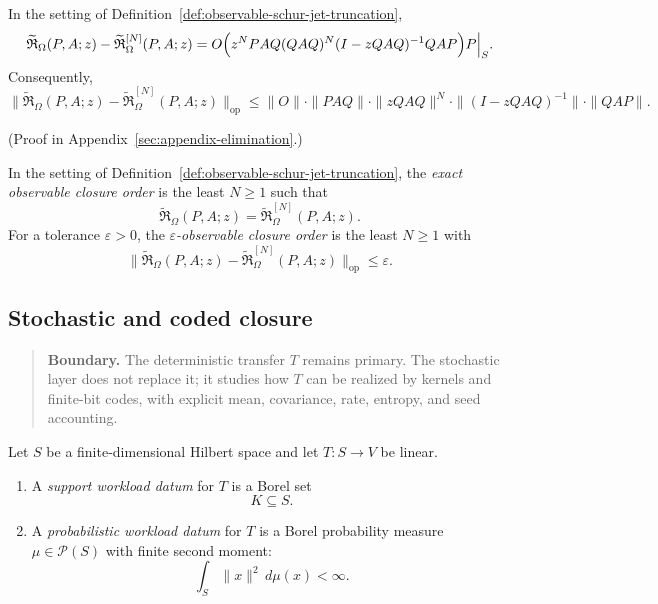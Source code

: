 \begin{theorem}
\label{thm:observable-schur-jet-remainder}
In the setting of Definition~\ref{def:observable-schur-jet-truncation},
\[
\widetilde{\mathfrak R}_{\Omega}(P,A;z)
-\widetilde{\mathfrak R}_{\Omega}^{[N]}(P,A;z)
=
O\Bigl(
z^N PAQ(QAQ)^N(I-zQAQ)^{-1}QAP
\Bigr)P\Big|_{S}.
\]
Consequently,
\[
\bigl\|
\widetilde{\mathfrak R}_{\Omega}(P,A;z)
-\widetilde{\mathfrak R}_{\Omega}^{[N]}(P,A;z)
\bigr\|_{\mathrm{op}}
\le
\|O\|\cdot \|PAQ\|\cdot \|zQAQ\|^N\cdot \|(I-zQAQ)^{-1}\|\cdot \|QAP\|.
\]
\end{theorem}

(Proof in Appendix~\ref{sec:appendix-elimination}.)

\begin{definition}
\label{def:observable-closure-order}
In the setting of Definition~\ref{def:observable-schur-jet-truncation}, the
\emph{exact observable closure order} is the least \(N\ge 1\) such that
\[
\widetilde{\mathfrak R}_{\Omega}(P,A;z)
=
\widetilde{\mathfrak R}_{\Omega}^{[N]}(P,A;z).
\]
For a tolerance \(\varepsilon>0\), the \emph{\(\varepsilon\)-observable closure
order} is the least \(N\ge 1\) with
\[
\bigl\|
\widetilde{\mathfrak R}_{\Omega}(P,A;z)
-\widetilde{\mathfrak R}_{\Omega}^{[N]}(P,A;z)
\bigr\|_{\mathrm{op}}
\le \varepsilon.
\]
\end{definition}

\subsection{Stochastic and coded closure}

\begin{quote}\small
\textbf{Boundary.}
The deterministic transfer \(T\) remains primary. The stochastic layer does not
replace it; it studies how \(T\) can be realized by kernels and finite-bit
codes, with explicit mean, covariance, rate, entropy, and seed accounting.
\end{quote}

\begin{definition}
\label{def:stochastic-workload-data}
Let \(S\) be a finite-dimensional Hilbert space and let \(T:S\to V\) be
linear.
\begin{enumerate}[label=(\roman*), leftmargin=2em, itemsep=0.2em]
\item A \emph{support workload datum} for \(T\) is a Borel set
      \[
      K\subseteq S.
      \]
\item A \emph{probabilistic workload datum} for \(T\) is a Borel probability
      measure \(\mu\in\mathcal P(S)\) with finite second moment:
      \[
      \int_S \|x\|^2\,d\mu(x)<\infty.
      \]
\end{enumerate}
\end{definition}

